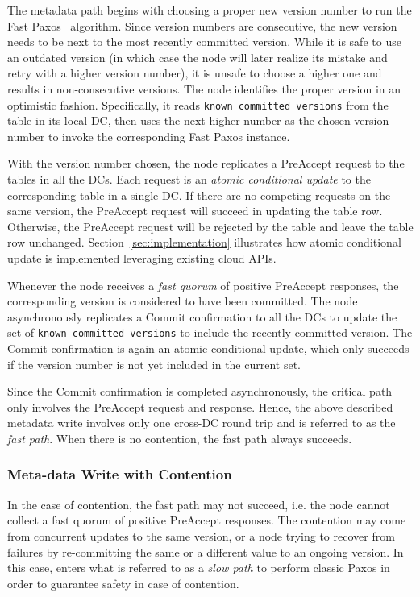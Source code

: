 The metadata path begins with choosing a proper new version number to run the Fast Paxos~\cite{fastpaxos} algorithm.
Since version numbers are consecutive, the new version needs to be next to the most recently committed version.
While it is safe to use an outdated version
(in which case the {\name} node will later realize its mistake and retry with a higher version number),
it is unsafe to choose a higher one and results in non-consecutive versions.
The {\name} node identifies the proper version in an optimistic fashion.
Specifically, it reads {\tt known committed versions} from the table in its local DC,
then uses the next higher number as the chosen version number to invoke the corresponding Fast Paxos instance.

With the version number chosen, the {\name} node replicates a PreAccept request
to the tables in all the DCs.
Each request is an {\em atomic conditional update} to the corresponding table in a single DC.
If there are no competing requests on the same version, the PreAccept request will succeed in updating the table row.
Otherwise, the PreAccept request will be rejected by the table and leave the table row unchanged.
Section~\ref{sec:implementation} illustrates how atomic conditional update is implemented leveraging existing cloud APIs.

Whenever the {\name} node receives a {\em fast quorum} of positive PreAccept responses,
the corresponding version is considered to have been committed.
The {\name} node asynchronously replicates a Commit confirmation to all the DCs to update 
the set of {\tt known committed versions} to include the recently committed version.
The Commit confirmation is again an atomic conditional update,
which only succeeds if the version number is not yet included in the current set.

Since the Commit confirmation is completed asynchronously,
the critical path only involves the PreAccept request and response.
Hence, the above described metadata write involves only one cross-DC round trip 
and is referred to as the {\em fast path}.  When there is no
contention, the fast path always succeeds.

\subsubsection{Meta-data Write with Contention}

In the case of contention, the fast path may not succeed, i.e. the {\name} node
cannot collect a fast quorum of positive PreAccept responses. The contention
may come from concurrent updates to the same version, or a {\name} node trying
to recover from failures by re-committing the same or a different value to an
ongoing version.  In this case, {\name} enters what is referred to as a
\emph{slow path} to perform classic Paxos in order to guarantee safety in case of
contention.

